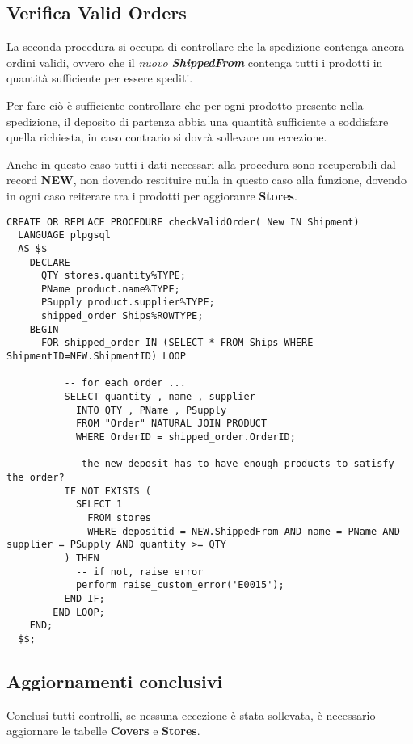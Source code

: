 \subsection{Verifica Valid Orders}

La seconda procedura si occupa di controllare che la spedizione contenga ancora ordini validi, ovvero che il \textit{nuovo \textbf{ShippedFrom}} contenga tutti i prodotti in quantità sufficiente per essere spediti.

Per fare ciò è sufficiente controllare che per ogni prodotto presente nella spedizione, il deposito di partenza abbia una quantità sufficiente a soddisfare quella richiesta, in caso contrario si dovrà sollevare un eccezione.

Anche in questo caso tutti i dati necessari alla procedura sono recuperabili dal record \textbf{NEW}, non dovendo restituire nulla in questo caso alla funzione, dovendo in ogni caso reiterare tra i prodotti per aggioranre \textbf{Stores}.

\begin{lstlisting}[caption={Procedure \textbf{checkValidOrder}}]
  CREATE OR REPLACE PROCEDURE checkValidOrder( New IN Shipment)
  LANGUAGE plpgsql
  AS $$
    DECLARE
      QTY stores.quantity%TYPE;
      PName product.name%TYPE;
      PSupply product.supplier%TYPE;
      shipped_order Ships%ROWTYPE;
    BEGIN
      FOR shipped_order IN (SELECT * FROM Ships WHERE ShipmentID=NEW.ShipmentID) LOOP
  
          -- for each order ...
          SELECT quantity , name , supplier 
            INTO QTY , PName , PSupply
            FROM "Order" NATURAL JOIN PRODUCT
            WHERE OrderID = shipped_order.OrderID;
  
          -- the new deposit has to have enough products to satisfy the order?
          IF NOT EXISTS (
            SELECT 1
              FROM stores
              WHERE depositid = NEW.ShippedFrom AND name = PName AND supplier = PSupply AND quantity >= QTY
          ) THEN
            -- if not, raise error
            perform raise_custom_error('E0015');
          END IF;
        END LOOP;
    END;
  $$;
\end{lstlisting}

\newpage
\subsection{Aggiornamenti conclusivi}

Conclusi tutti controlli, se nessuna eccezione è stata sollevata, è necessario aggiornare le tabelle \textbf{Covers} e \textbf{Stores}.

